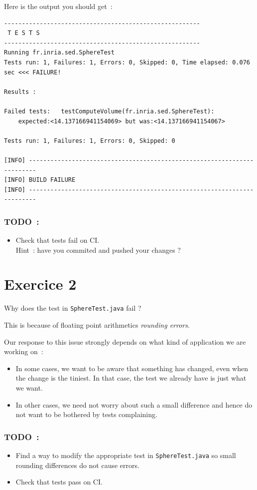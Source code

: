 \documentclass{article}
\begin{document}
Here is the output you should get~:
\begin{lstlisting}
-------------------------------------------------------
 T E S T S
-------------------------------------------------------
Running fr.inria.sed.SphereTest
Tests run: 1, Failures: 1, Errors: 0, Skipped: 0, Time elapsed: 0.076 sec <<< FAILURE!

Results :

Failed tests:   testComputeVolume(fr.inria.sed.SphereTest):
    expected:<14.137166941154069> but was:<14.137166941154067>

Tests run: 1, Failures: 1, Errors: 0, Skipped: 0

[INFO] ------------------------------------------------------------------------
[INFO] BUILD FAILURE
[INFO] ------------------------------------------------------------------------
\end{lstlisting}

\subsubsection{TODO~:}
\begin{itemize}
\item Check that tests fail on CI. \\
Hint~: have you commited and pushed your changes ?
\end{itemize}

\section{Exercice 2}

Why does the test in \texttt{SphereTest.java} fail ?

This is because of floating point arithmetics \emph{rounding errors}.

Our response to this issue strongly depends on what kind of application we are working on~:
\begin{itemize}
\item In some cases, we want to be aware that something has changed, even when the change is the tiniest. In that case, the test we already have is just what we want.
\item In other cases, we need not worry about such a small difference and hence do not want to be bothered by tests complaining.
\end{itemize}

\subsubsection{TODO~:}
\begin{itemize}
\item Find a way to modify the appropriate test in \texttt{SphereTest.java}
so small rounding differences do not cause errors.
\item Check that tests pass on CI.
\end{itemize}
\end{document}
